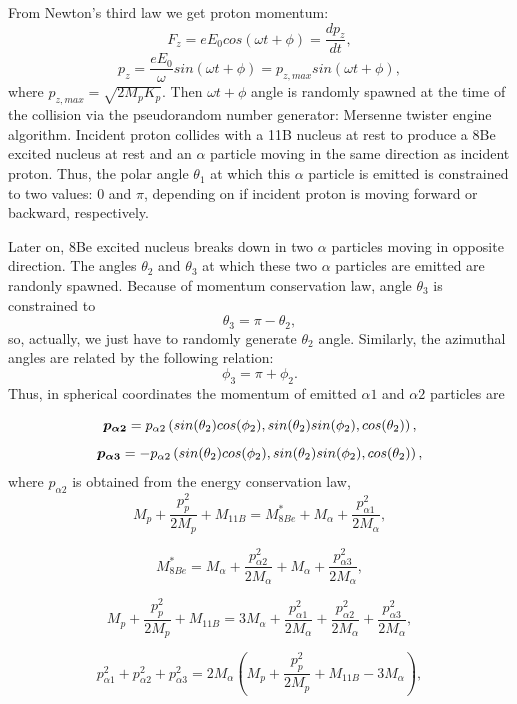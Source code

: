 \documentclass[aps,prc,twocolumn,floatfix,showpacs,a4paper,
nofootinbib,amsmath,amssymb]{revtex4}
\newcommand{\be}{\begin{equation}}
\newcommand{\ee}{\end{equation}}
\renewcommand{\vec}[1]{\mbox{\boldmath$#1$}}
\begin{document}
From Newton's third law we get proton momentum:
\begin{equation}
F_z = e E_0cos(\omega t + \phi) = \frac{dp_z}{dt},
\end{equation}
\begin{equation}
p_z = \frac{eE_0}{\omega} sin(\omega t + \phi) = p_{z,max} sin(\omega t + \phi),
\end{equation}
where $p_{z,max} = \sqrt{2M_pK_p}$. Then $\omega t + \phi$ angle is randomly spawned at the time of the collision via the pseudorandom number generator: Mersenne twister engine algorithm. Incident proton collides with a 11B nucleus at rest to produce a 8Be excited nucleus at rest and an $\alpha$ particle moving in the same direction as incident proton. Thus, the polar angle $\theta_1$ at which this $\alpha$ particle is emitted is constrained to two values: $0$ and $\pi$, depending on if incident proton is moving forward or backward, respectively.



Later on, 8Be excited nucleus breaks down in two $\alpha$ particles moving in opposite direction. The angles $\theta_2$ and $\theta_3$ at which these two $\alpha$ particles are emitted are randonly spawned. Because of momentum conservation law, angle $\theta_3$ is constrained to
\be
\theta_3 = \pi - \theta_2,
\ee
so, actually, we just have to randomly generate $\theta_2$ angle. Similarly, the azimuthal angles are related by the following relation:
\be
\phi_3 = \pi + \phi_2.
\ee
Thus, in spherical coordinates the momentum of emitted $\alpha 1$ and $\alpha 2$ particles are 

\be
\vec{p_{\alpha2}} = p_{\alpha2}\left(sin(\theta_2)cos(\phi_2),sin(\theta_2)sin(\phi_2),cos(\theta_2)\right),
\ee
\be
\vec{p_{\alpha3}} = -p_{\alpha2}\left(sin(\theta_2)cos(\phi_2),sin(\theta_2)sin(\phi_2),cos(\theta_2)\right),
\ee
where $p_{\alpha 2}$ is obtained from the energy conservation law,
\be
M_p + \frac{p_p^2}{2M_p} + M_{11B} = M_{8Be}^* + M_{\alpha} + \frac{p_{\alpha1}^2}{2M_{\alpha}},
\ee

\be
M_{8Be}^* = M_{\alpha} + \frac{p_{\alpha2}^2}{2M_{\alpha}} + M_{\alpha} + \frac{p_{\alpha3}^2}{2M_{\alpha}},
\ee

\be
M_p + \frac{p_p^2}{2M_p} + M_{11B} = 3M_{\alpha} + \frac{p_{\alpha1}^2}{2M_{\alpha}} + \frac{p_{\alpha2}^2}{2M_{\alpha}} + \frac{p_{\alpha3}^2}{2M_{\alpha}},
\ee

\be
p_{\alpha1}^2 + p_{\alpha2}^2 + p_{\alpha3}^2 = 2M_{\alpha}\left(M_p + \frac{p_p^2}{2M_p} + M_{11B} - 3M_{\alpha}\right),
\ee
\end{document}

